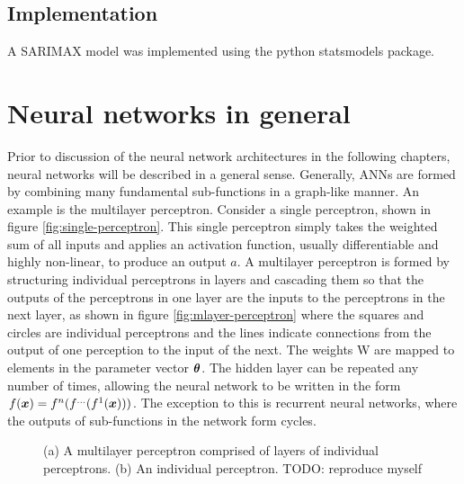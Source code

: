\subsection{Implementation}
A SARIMAX model was implemented using the python statsmodels package.


\section{Neural networks in general}
Prior to discussion of the neural network architectures in the following chapters, neural networks will be described in a general sense.
Generally, ANNs are formed by combining many fundamental sub-functions in a graph-like manner. 
An example is the multilayer perceptron.
Consider a single perceptron, shown in figure \ref{fig:single-perceptron}.
This single perceptron simply takes the weighted sum of all inputs and applies an activation function, usually differentiable and highly non-linear, to produce an output $a$.
A multilayer perceptron is formed by structuring individual perceptrons in layers and cascading them so that the outputs of the perceptrons in one layer are the inputs to the perceptrons in the next layer, as shown in figure \ref{fig:mlayer-perceptron} where the squares and circles are individual perceptrons and the lines indicate connections from the output of one perception to the input of the next.
The weights W are mapped to elements in the parameter vector ${\bm{\theta}}$.
The hidden layer can be repeated any number of times, allowing the neural network to be written in the form $f({\bm{x}}) = f^n(f^{\ldots}(f^1({\bm{x}})))$.
The exception to this is recurrent neural networks, where the outputs of sub-functions in the network form cycles.
\begin{figure}[htbp]
	\centering
	\quad\quad
	\caption{(a) A multilayer perceptron comprised of layers of individual perceptrons. (b) An individual perceptron. TODO: reproduce myself}
	\label{fig:simple-ann}
\end{figure}
